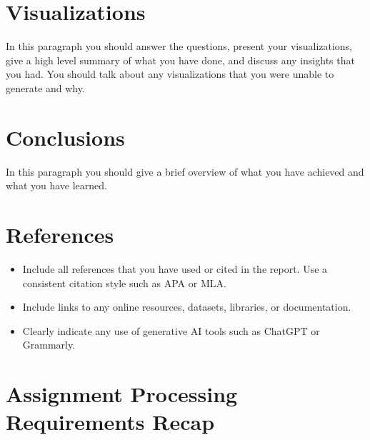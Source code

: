 \documentclass[11pt]{article}
\begin{document}
\section{Visualizations}

In this paragraph you should answer the questions, present your visualizations, give a high level summary of what you have done, and discuss any insights that you had. You should talk about any visualizations that you were unable to generate and why.

\section{Conclusions}

In this paragraph you should give a brief overview of what you have achieved and what you have learned.


\section{References}

\begin{itemize}
    \item Include all references that you have used or cited in the report. Use a consistent citation style such as APA or MLA.
    \item Include links to any online resources, datasets, libraries, or documentation.
    \item Clearly indicate any use of generative AI tools such as ChatGPT or Grammarly.
\end{itemize}







\section*{Assignment Processing Requirements Recap}
\end{document}
